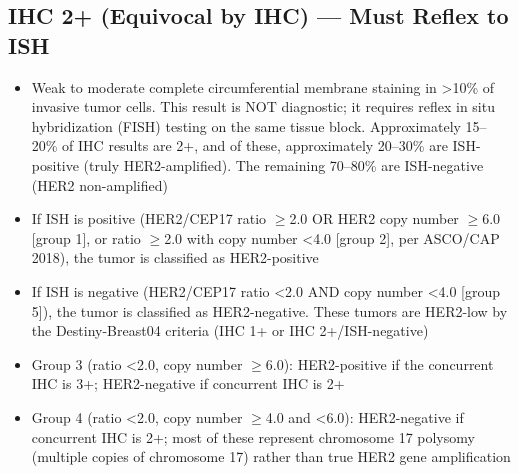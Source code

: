 \subsection*{IHC 2+ (Equivocal by IHC) --- Must Reflex to ISH}
\begin{itemize}
  \item Weak to moderate complete circumferential membrane staining in >10\% of invasive tumor cells. This result is NOT diagnostic; it requires reflex in situ hybridization (FISH) testing on the same tissue block. Approximately 15--20\% of IHC results are 2+, and of these, approximately 20--30\% are ISH-positive (truly HER2-amplified). The remaining 70--80\% are ISH-negative (HER2 non-amplified)
  \item If ISH is positive (HER2/CEP17 ratio $\geq$2.0 OR HER2 copy number $\geq$6.0 [group 1], or ratio $\geq$2.0 with copy number <4.0 [group 2], per ASCO/CAP 2018), the tumor is classified as HER2-positive
  \item If ISH is negative (HER2/CEP17 ratio <2.0 AND copy number <4.0 [group 5]), the tumor is classified as HER2-negative. These tumors are HER2-low by the Destiny-Breast04 criteria (IHC 1+ or IHC 2+/ISH-negative)
  \item Group 3 (ratio <2.0, copy number $\geq$6.0): HER2-positive if the concurrent IHC is 3+; HER2-negative if concurrent IHC is 2+
  \item Group 4 (ratio <2.0, copy number $\geq$4.0 and <6.0): HER2-negative if concurrent IHC is 2+; most of these represent chromosome 17 polysomy (multiple copies of chromosome 17) rather than true HER2 gene amplification
\end{itemize}

